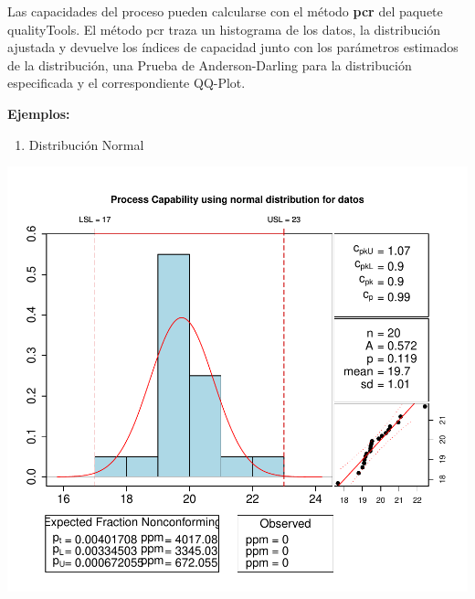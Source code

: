 \documentclass[
]{book}
\newenvironment{Shaded}{\begin{snugshade}}{\end{snugshade}}
\newcommand{\AttributeTok}[1]{\textcolor[rgb]{0.13,0.29,0.53}{#1}}
\newcommand{\DecValTok}[1]{\textcolor[rgb]{0.00,0.00,0.81}{#1}}
\newcommand{\DocumentationTok}[1]{\textcolor[rgb]{0.56,0.35,0.01}{\textbf{\textit{#1}}}}
\newcommand{\FunctionTok}[1]{\textcolor[rgb]{0.13,0.29,0.53}{\textbf{#1}}}
\newcommand{\NormalTok}[1]{#1}
\newcommand{\OtherTok}[1]{\textcolor[rgb]{0.56,0.35,0.01}{#1}}
\newcommand{\StringTok}[1]{\textcolor[rgb]{0.31,0.60,0.02}{#1}}
\providecommand{\tightlist}{%
  \setlength{\itemsep}{0pt}\setlength{\parskip}{0pt}}
\begin{document}
Las capacidades del proceso pueden calcularse con el método \textbf{pcr} del paquete qualityTools. El método pcr traza un histograma de los datos, la distribución ajustada y devuelve los índices de capacidad junto con los parámetros estimados de la distribución, una Prueba de Anderson-Darling para la distribución especificada y el correspondiente QQ-Plot.

\textbf{Ejemplos:}

\begin{enumerate}
\def\labelenumi{\arabic{enumi}.}
\tightlist
\item
  Distribución Normal
\end{enumerate}

\begin{Shaded}
\end{Shaded}

\begin{center}\includegraphics{Libro_TidyQualityTools_files/figure-latex/unnamed-chunk-85-1} \end{center}
\end{document}
